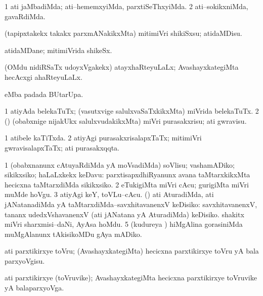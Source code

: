 \bentry
{}
\gl{\kirxvi}
\bmng
\bnum
\num{1} ati jaMbadiMda; ati--hememxyiMda, parxtiSeThxyiMda. 
\num{2} ati--sokikxniMda, gavaRdiMda. 
\enum
\emng
\eentry


\bentry
{}
\gl{\sakirx}
\bmng
(tapipxtakekx takakx parxmANakikxMta) mitimiVri shikiSxsu; atidaMDisu. 
\emng
\eentry


\bentry
{}
\gl{\nA}
\bmng
atidaMDane; mitimiVrida shikeSx. 
\emng
\eentry


\bentry
{}
\gl{\gu}
\bmng
(OMdu nidiRSaTx udoyxVgakekx) atayxhaRteyuLaLx; AvashayxkategiMta hecAcxgi ahaRteyuLaLx. 
\emng
\eentry


\bentry
{}
\gl{\kirx}
\bmng
{} eMba padada BUtarUpa. 
\emng
\eentry


\bentry
{}
\gl{\sakirx}
\bmng
\bnum
\num{1} atiyAda belekaTuTx; (vasutxvige salulxvaSaTxkikxMta) miVrida belekaTuTx. 
\num{2} (\rUpa) (obabxnige nijakUkx salulxvudakikxMta) miVri purasakxrisu; ati gwravisu. 
\enum
\emng
\eentry


\bentry
{}
\gl{\gu}
\bmng
\bnum
\num{1} atibele kaTiTxda. 
\num{2} atiyAgi purasakxrisalapxTaTx; mitimiVri gwravisalapxTaTx; ati purasakxqqta. 
\enum
\emng
\eentry


\bentry
{}
\gl{\sakirx}
\bmng
\bnum
\num{1} (obabxnanunx cAtuyaRdiMda yA moVsadiMda) soVlisu; vashamADiko; sikikxsiko; haLaLxkekx keDavu:  parxtisapxdhiRyanunx avana taMtarxkikxMta hecicxna taMtarxdiMda sikikxsiko. 
\num{2} eTukigiMta miVri cAcu; gurigiMta miVri muMde hoVgu. 
\num{3} atiyAgi keY, toVLu--cAcu. 
 (\AtAmx) ati AturadiMda, ati jANatanadiMda yA taMtarxdiMda--savxhitavanenxV keDisiko:  
\banum
{} savxhitavanenxV, tananx udedxVshavanenxV (ati jANatana yA AturadiMda) keDisiko. 
 shakitx miVri sharxmisi--daNi, AyAsa hoMdu. 
\eanum
\numie
\num{5} (kudureya \vi) hiMgAlina gorasiniMda muMgAlanunx tAkisikoMDu gAya mADiko. 
\enum
\emng
\eentry


\bentry
{}
\gl{\akirx}
\bmng
ati parxtikirxye toVru; (AvashayxkategiMta) hecicxna parxtikirxye toVru yA bala parxyoVgisu. 
\emng
\eentry


\bentry
{}
\gl{\nA}
\bmng
ati parxtikirxye (toVruvike); AvashayxkategiMta hecicxna parxtikirxye toVruvike yA balaparxyoVga. 
\emng
\eentry


